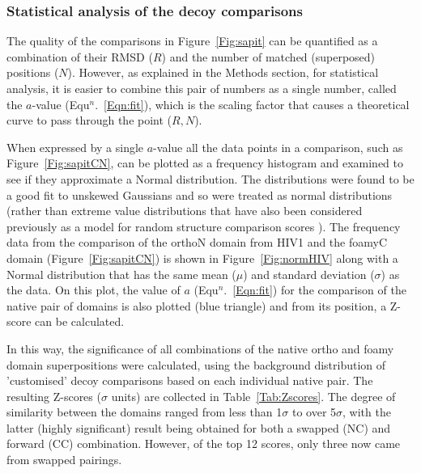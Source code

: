 \documentclass[preprint,12pt]{elsarticle}
\newcommand{\Tab}[1]{Table~\ref{Tab:#1}}
\newcommand{\Fig}[1]{Figure~\ref{Fig:#1}}
\newcommand{\Eqn}[1]{Equ$^n$.~\ref{Eqn:#1}}
\begin{document}
\subsubsection{Statistical analysis of the decoy comparisons}

The quality of the comparisons in \Fig{sapit} can be quantified as a combination of their
RMSD ($R$) and the number of matched (superposed) positions ($N$).   However, as explained in
the Methods section, for statistical analysis, it is easier to combine this pair of numbers
as a single number,  called the $a$-value (\Eqn{fit}), which is the scaling factor that
causes a theoretical curve to pass through the point ($R,N$).

When expressed by a single $a$-value
all the data points in a comparison, such as \Fig{sapitCN},
can be plotted as a frequency histogram and examined to see if they approximate a Normal
distribution.   The distributions were found to be a good fit to unskewed Gaussians and
so were treated as normal distributions (rather than extreme value distributions
that have also been considered previously as a model for random structure comparison scores
\cite{LevittMet98,TaylorWR06a}).    The frequency data from the comparison of the orthoN domain from
HIV1 and the foamyC domain (\Fig{sapitCN}) is shown in \Fig{normHIV} along with a Normal
distribution that has the same mean ($\mu$) and standard deviation ($\sigma$) as the data.
On this plot, the value of $a$ (\Eqn{fit}) for the comparison of the
native pair of domains is also plotted (blue triangle) and from its position, a Z-score
can be calculated.

In this way, the significance of all combinations of the native ortho and foamy domain
superpositions were calculated, using the background distribution of 'customised' decoy
comparisons based on each individual native pair.   The resulting Z-scores ($\sigma$ units)
are collected in \Tab{Zscores}.   The degree of similarity between the domains ranged from
less than 1$\sigma$ to over 5$\sigma$, with the latter (highly significant) result being
obtained for both a swapped (NC) and forward (CC) combination.   However, of the top 12
scores, only three now came from swapped pairings.
\end{document}
